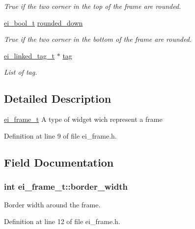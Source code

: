\begin{DoxyCompactItemize}
\begin{DoxyCompactList}\small\item\em True if the two corner in the top of the frame are rounded. \end{DoxyCompactList}\item 
\hyperlink{ei__types_8h_a383b9af13bd6a0a893096ead3c4d8e28}{ei\+\_\+bool\+\_\+t} \hyperlink{structei__frame__t_a38fd04cba482eb2db2705afd10f2060f}{rounded\+\_\+down}
\begin{DoxyCompactList}\small\item\em True if the two corner in the bottom of the frame are rounded. \end{DoxyCompactList}\item 
\hyperlink{structei__linked__tag__t}{ei\+\_\+linked\+\_\+tag\+\_\+t} $\ast$ \hyperlink{structei__frame__t_adfe60fa92f5065b279f46b716f2ccd73}{tag}
\begin{DoxyCompactList}\small\item\em List of tag. \end{DoxyCompactList}\end{DoxyCompactItemize}


\subsection{Detailed Description}
\hyperlink{structei__frame__t}{ei\+\_\+frame\+\_\+t} A type of widget wich represent a frame 

Definition at line 9 of file ei\+\_\+frame.\+h.



\subsection{Field Documentation}
\hypertarget{structei__frame__t_a3f06d929024f5c8355099f1ea734ddd8}{
\subsubsection[{border\+\_\+width}]{\setlength{\rightskip}{0pt plus 5cm}int ei\+\_\+frame\+\_\+t\+::border\+\_\+width}}\label{structei__frame__t_a3f06d929024f5c8355099f1ea734ddd8}


Border width around the frame. 



Definition at line 12 of file ei\+\_\+frame.\+h.

